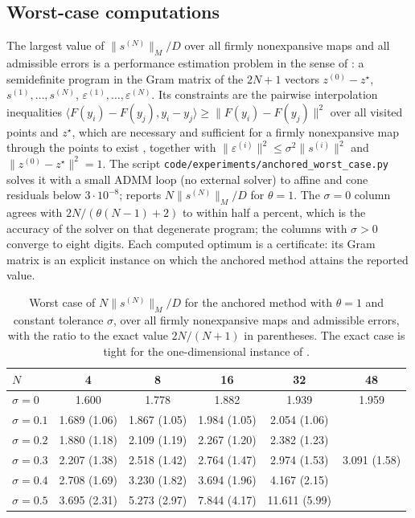 \subsection{Worst-case computations}\label{sec:acc-pep}
The largest value of $\|s^{(N)}\|_M/D$ over all firmly nonexpansive maps and all admissible errors is a performance estimation problem in the sense of \citet{taylor2017smooth}: a semidefinite program in the Gram matrix of the $2N+1$ vectors $z^{(0)} - z^\star$, $s^{(1)}, \ldots, s^{(N)}$, $\varepsilon^{(1)}, \ldots, \varepsilon^{(N)}$.
Its constraints are the pairwise interpolation inequalities $\langle F(y_i) - F(y_j), y_i - y_j\rangle \ge \|F(y_i) - F(y_j)\|^2$ over all visited points and $z^\star$, which are necessary and sufficient for a firmly nonexpansive map through the points to exist \citep{ryu2020operator}, together with $\|\varepsilon^{(i)}\|^2 \le \sigma^2\|s^{(i)}\|^2$ and $\|z^{(0)} - z^\star\|^2 = 1$.
The script \texttt{code/experiments/anchored\_worst\_case.py} solves it with a small ADMM loop (no external solver) to affine and cone residuals below $3\cdot 10^{-8}$;  reports $N\|s^{(N)}\|_M/D$ for $\theta = 1$.
The $\sigma = 0$ column agrees with $2N/(\theta(N-1)+2)$ to within half a percent, which is the accuracy of the solver on that degenerate program; the columns with $\sigma > 0$ converge to eight digits.
Each computed optimum is a certificate: its Gram matrix is an explicit instance on which the anchored method attains the reported value.

\begin{table}
    \centering
    \caption{Worst case of $N\|s^{(N)}\|_M/D$ for the anchored method with $\theta = 1$ and constant tolerance $\sigma$, over all firmly nonexpansive maps and admissible errors, with the ratio to the exact value $2N/(N+1)$ in parentheses.
    The exact case is tight for the one-dimensional instance of .}
    \label{tab:acc-pep}
    \begin{tabular}{lccccc}
        \toprule
        $N$ & 4 & 8 & 16 & 32 & 48 \\
        \midrule
        $\sigma = 0$   & 1.600 & 1.778 & 1.882 & 1.939 & 1.959 \\
        $\sigma = 0.1$ & 1.689 (1.06) & 1.867 (1.05) & 1.984 (1.05) & 2.054 (1.06) & \\
        $\sigma = 0.2$ & 1.880 (1.18) & 2.109 (1.19) & 2.267 (1.20) & 2.382 (1.23) & \\
        $\sigma = 0.3$ & 2.207 (1.38) & 2.518 (1.42) & 2.764 (1.47) & 2.974 (1.53) & 3.091 (1.58) \\
        $\sigma = 0.4$ & 2.708 (1.69) & 3.230 (1.82) & 3.694 (1.96) & 4.167 (2.15) & \\
        $\sigma = 0.5$ & 3.695 (2.31) & 5.273 (2.97) & 7.844 (4.17) & 11.611 (5.99) & \\
        \bottomrule
    \end{tabular}
\end{table}

